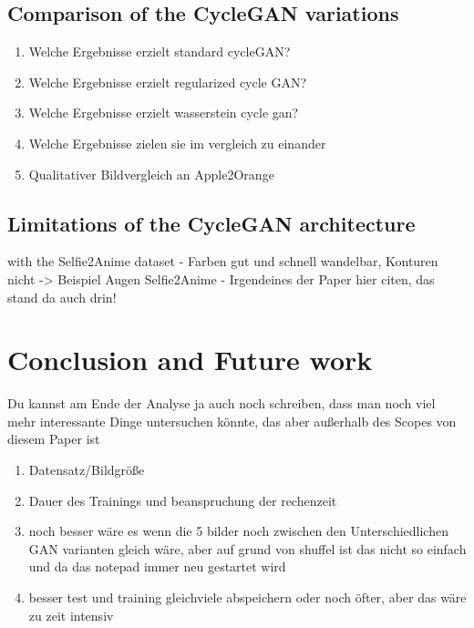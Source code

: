 \documentclass[fleqn,10pt]{SelfArx} %
\begin{document}
\subsection{Comparison of the Cycle\ac{GAN} variations}
\begin{enumerate}[noitemsep] %
	\item Welche Ergebnisse erzielt standard cycleGAN?
	\item Welche Ergebnisse erzielt regularized cycle GAN?
	\item Welche Ergebnisse erzielt wasserstein cycle gan?
	\item Welche Ergebnisse zielen sie im vergleich zu einander
	\item Qualitativer Bildvergleich an Apple2Orange
\end{enumerate}

\subsection{Limitations of the Cycle\ac{GAN} architecture}
with the Selfie2Anime dataset - Farben gut und schnell wandelbar, Konturen nicht -> Beispiel Augen Selfie2Anime - Irgendeines der Paper hier citen, das stand da auch drin!

\section{Conclusion and Future work}
Du kannst am Ende der Analyse ja auch noch schreiben, dass man noch viel mehr interessante Dinge untersuchen könnte, das aber außerhalb des Scopes von diesem Paper ist
\begin{enumerate}[noitemsep] %
	\item Datensatz/Bildgröße
	\item Dauer des Trainings und beanspruchung der rechenzeit
	\item noch besser wäre es wenn die 5 bilder noch zwischen den Unterschiedlichen GAN varianten gleich wäre, aber auf grund von shuffel ist das nicht so einfach und da das notepad immer neu gestartet wird
	\item besser test und training gleichviele abspeichern oder noch öfter, aber das wäre zu zeit intensiv
\end{enumerate}

\end{document}
